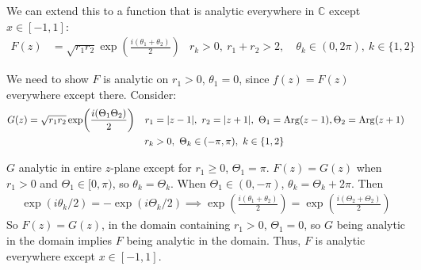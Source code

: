 \documentclass[12pt, english]{book}
\DeclareMathOperator\Arg{Arg}
\begin{document}
\begin{example}
\begin{figure}[H]
		\end{figure}
	
		We can extend this to a function that is analytic everywhere in \(\mathbb{C}\) except \(x \in [-1, 1]\):
		\begin{align*}
			F(z) &= \sqrt{r_1 r_2} \exp(\frac{i(\theta_1 + \theta_2)}{2}) &
				r_k > 0, \ r_1 + r_2 > 2, &\ \theta_k \in (0, 2\pi), \ k \in \{1,2\}
		\end{align*}
	
		We need to show \(F\) is analytic on \(r_1>0\), \(\theta_1 =0\), since \(f(z) = F(z)\) everywhere except there. Consider:
		\begin{align*}
			G(z) &= \sqrt{r_1 r_2} \exp(\frac{i(\Theta_1 \Theta_2)}{2})	&
				r_1 &= \abs{z-1}, \ r_2 = \abs{z+1}, \ \Theta_1 = \Arg(z-1), \Theta_2 = \Arg(z+1) \\
			&&
				r_k &> 0, \ \Theta_k \in (-\pi, \pi), \ k \in \{1,2\}
		\end{align*}
			
		\(G\) analytic in entire \(z\)-plane except for \(r_1 \geq 0\), \(\Theta_1 = \pi\). \(F(z) = G(z)\) when \(r_1 >0\) and \(\Theta_1 \in [0,\pi)\), so \(\theta_k = \Theta_k\). When \(\Theta_1 \in (0, -\pi)\), \(\theta_k = \Theta_k + 2\pi\).
		Then
		\begin{align*}
			\exp(i\theta_k/2) = -\exp(i\Theta_k/2) 
			\implies \exp(\frac{i(\theta_1 + \theta_2)}{2}) = \exp(\frac{i(\Theta_2 + \Theta_2)}{2})
		\end{align*}
		So \(F(z) = G(z)\), in the domain containing \(r_1 > 0\), \(\Theta_1 = 0\), so \(G\) being analytic in the domain implies \(F\) being analytic in the domain. Thus, \(F\) is analytic everywhere except \(x \in [-1, 1]\).
		

\end{example}
\end{document}
